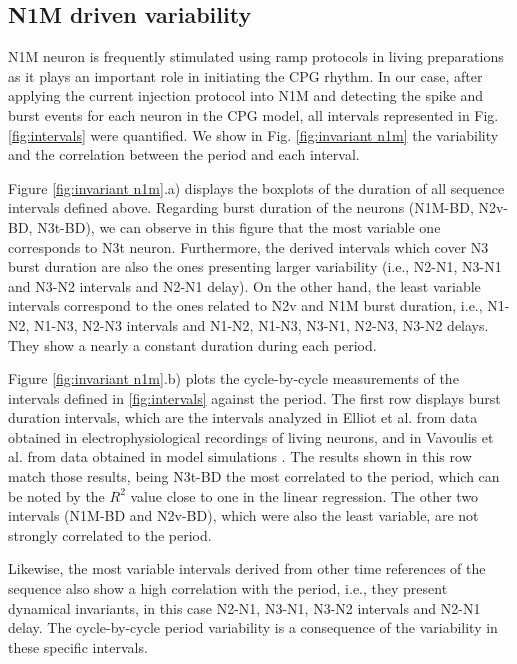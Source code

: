 \subsection{N1M driven variability}
\label{subsec:n1m driven}

N1M neuron is frequently stimulated using ramp protocols in living preparations \parencite{Elliott1991} as it plays an important role in initiating the CPG rhythm. In our case, after applying the current injection protocol into N1M and detecting the spike and burst events for each neuron in the CPG model, all  intervals represented in Fig. \ref{fig:intervals} were quantified. We show in Fig. \ref{fig:invariant n1m} the variability and the correlation between the period and each interval.

Figure \ref{fig:invariant n1m}.a) displays the boxplots of the duration of all sequence intervals defined above. Regarding burst duration of the neurons (N1M-BD, N2v-BD, N3t-BD), we can observe in this figure that the most variable one corresponds to N3t neuron. Furthermore, the derived intervals which cover N3 burst duration are also the ones presenting larger variability (i.e., N2-N1, N3-N1 and N3-N2 intervals and N2-N1 delay). On the other hand, the least variable intervals correspond to the ones related to N2v and N1M burst duration, i.e., N1-N2, N1-N3, N2-N3 intervals and N1-N2, N1-N3, N3-N1, N2-N3, N3-N2 delays. They show a nearly a constant duration during each period.

Figure \ref{fig:invariant n1m}.b) plots the cycle-by-cycle measurements of the intervals defined in \ref{fig:intervals} against the period. The first row displays burst duration intervals, which are the intervals analyzed in Elliot et al. \parencite{Elliott1991} from data obtained in electrophysiological recordings of living neurons, and in Vavoulis et al. from data obtained in model simulations \parencite{vavoulis_computational_2007}. The results shown in this row match those results, being N3t-BD the most correlated to the period, which can be noted by the $R^2$ value close to one in the linear regression. The other two intervals (N1M-BD and N2v-BD), which were also the least variable, are not strongly correlated to the period. 

Likewise, the most variable intervals derived from other time references of the sequence also show a high correlation with the period, i.e., they present dynamical invariants, in this case N2-N1, N3-N1, N3-N2 intervals and N2-N1 delay. The cycle-by-cycle period variability is a consequence of the variability in these specific intervals.

